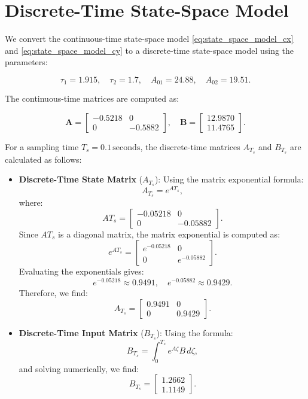 \section{Discrete-Time State-Space Model}
We convert the continuous-time state-space model \eqref{eq:state_space_model_cx} and \eqref{eq:state_space_model_cy} to a discrete-time state-space model using the parameters:

\[
\tau_1 = 1.915, \quad \tau_2 = 1.7, \quad A_{01} = 24.88, \quad A_{02} = 19.51.
\]

The continuous-time matrices are computed as:

\[
\mathbf{A} = 
\begin{bmatrix}
-0.5218 & 0 \\
0 & -0.5882
\end{bmatrix}, \quad 
\mathbf{B} = 
\begin{bmatrix}
12.9870 \\
11.4765
\end{bmatrix}.
\]

For a sampling time \( T_s = 0.1 \, \text{seconds} \), the discrete-time matrices \( A_{T_s} \) and \( B_{T_s} \) are calculated as follows:

\begin{itemize}
    \item \textbf{Discrete-Time State Matrix} (\(A_{T_s}\)): 
   Using the matrix exponential formula:
   \[
   A_{T_s} = e^{A T_s},
   \]
   where:
   \[
   A T_s = 
   \begin{bmatrix}
   -0.05218 & 0 \\
   0 & -0.05882
   \end{bmatrix}.
   \]
   Since \( A T_s \) is a diagonal matrix, the matrix exponential is computed as:
   \[
   e^{A T_s} = 
   \begin{bmatrix}
   e^{-0.05218} & 0 \\
   0 & e^{-0.05882}
   \end{bmatrix}.
   \]
   Evaluating the exponentials gives:
   \[
   e^{-0.05218} \approx 0.9491, \quad e^{-0.05882} \approx 0.9429.
   \]
   Therefore, we find:
   \[
   A_{T_s} = 
   \begin{bmatrix}
   0.9491 & 0 \\
   0 & 0.9429
   \end{bmatrix}.
   \]
\end{itemize}

\begin{itemize} 
    \item \textbf{Discrete-Time Input Matrix} (\(B_{T_s}\)): 
   Using the formula:
   \[
   B_{T_s} = \int_0^{T_s} e^{A \zeta} B \, d\zeta,
   \]
   and solving numerically, we find:
   \[
   B_{T_s} = 
   \begin{bmatrix}
   1.2662 \\
   1.1149
   \end{bmatrix}.
   \]
\end{itemize}

